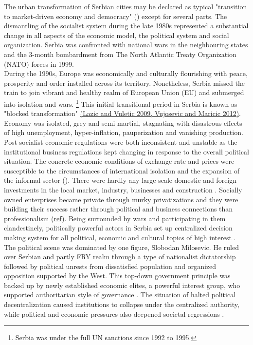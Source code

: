 \documentclass[11pt]{report}
\begin{document}
The urban transformation of Serbian cities may be declared as typical "transition to market-driven economy and democracy" (\href{}{\citealt{tsenkova_beyond_2006}}) except for several parts. The dismantling of the socialist system during the late 1980s represented a substantial change in all aspects of the economic model, the political system and social organization.
Serbia was confronted with national wars in the neighbouring states and the 3-month bombardment from The North Atlantic Treaty Organization (NATO) forces in 1999.
\\

During the 1990s, Europe was economically and culturally flourishing with peace, prosperity and order installed across its territory.
Nonetheless, Serbia missed the train to join vibrant and healthy realm of European Union (EU) and submerged into isolation and wars. \footnote{Serbia was under the full UN sanctions since 1992 to 1995.} 
This initial transitional period in Serbia is known as "blocked transformation" \href{}{(Lazic and Vuletic 2009, Vujosevic and Maricic 2012)}.
Economy was isolated, grey and semi-martial, stagnating with disastrous effects of high unemployment, hyper-inflation, pauperization and vanishing production.
Post-socialist economic regulations were both inconsistent and unstable as the institutional business regulations kept changing in response to the overall political situation. The concrete economic conditions of exchange rate and prices were susceptible to the circumstances of international isolation and the expansion of the informal sector (\cite{from Grozdanic find references}).
There were hardly any large-scale domestic and foreign investments in the local market, industry, businesses and construction \href{}{\citealt{vujosevic_planning_2006}}.
Socially owned enterprises became private through murky privatizations and they were building their success rather through political and business connections than professionalism \href{}{(ref)}.
Being surrounded by wars and participating in them clandestinely, politically powerful actors in Serbia set up centralized decision making system for all political, economic and cultural topics of high interest \href{}{\citealt{nedovic-budic_mornings_2011}}.
The political scene was dominated by one figure, Slobodan Milosevic.
He ruled over Serbian and partly FRY realm through a type of nationalist dictatorship followed by political unrests from dissatisfied population and organized opposition supported by the West.
This top-down government principle was backed up by newly established economic elites, a powerful interest group, who supported authoritarian style of governance \href{}{\citealt{vujovic_belgrades_2007}}.
The situation of halted political decentralization caused institutions to collapse under the centralized authority, while political and economic pressures also deepened societal regressions \href{}{\citealt{nedovic-budic_mornings_2011}}. 
\\
\end{document}
